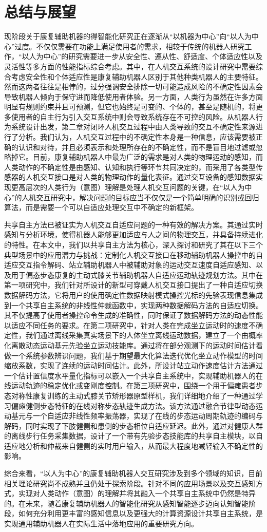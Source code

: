 \chapter{总结与展望}
现阶段关于康复辅助机器的得智能化研究正在逐渐从``以机器为中心''向``以人为中心''过度。不仅仅需要在功能上满足使用者的需求，相较于传统的机器人研究工作，``以人为中心''的研究需要进一步从安全性、遵从性、舒适度、个体适应性以及灵活性等多方面的性能指标综合考虑。其中，在人机交互系统的设计研究中需要综合考虑安全性和个体适应性是康复辅助机器人区别于其他种类机器人的主要特征。然而这两者往往是相悖的，过分强调安全排除一切可能造成风险的不确定性因素会导致机器人倾向于保守进而降低使用者体验。另一方面，人类行为虽然在许多方面明显有规则约束并且可预测，但它也始终是可变的、个体的，甚至是随机的，将更多使用者的自主行为引入交互系统中则会导致系统存在不可控的风险。从机器人行为系统设计出发，第二章对闭环人机交互过程中由人类导致的交互不确定性来源进行了分析。我们认为，人机交互过程中的不确定性本身是一种信息，应该需要被正确的认识和对待，并且必须表示和处理所存在的不确定性，而不是盲目地过滤或忽略掉它。目前，康复辅助机器人中最为广泛的需求是对人类的物理运动的感知，而人类动作的不确定性是由感知、认知和执行等环节共同决定的，而采用了各类型传感器的人机交互接口是对人类的物理动作的量化表征。通过交互设备的感知数据实现更高层次的人类行为（意图）理解是处理人机交互问题的关键，在``以人为中心''的人机交互研究中，解决问题的目标应当不仅仅是一个简单明确的识别或回归算法，而是需要一个可以自适应处理交互中不确定的新框架。

共享自主方法已被证实为人机交互自适应问题的一种有效的解决方案。其通过实时感知与分析环境，使得机器人能够更加适应与人之间的物理交互，并具备持续进化的特性。在本文中，我们以共享自主方法为核心，深入探讨和研究了其在以下三个典型场景中的应用潜力与挑战：定制化人机交互接口在移动辅助机器人操控中的自适应交互指令解码、站立辅助机器人中被辅助对象的运动交互速度自适应感知、以及用于偏态步态康复的主动式膝关节辅助机器人自适应运动轨迹规划方法。其中在第一项研究中，我们针对所设计的新型可穿戴人机交互接口提出了一种自适应切换数据解码方法，它将用户的使用确定性数据映射模式操控光标的先验表现信息集成到一个共享自主系统的非线性仲裁函数中，实现两种数据解码方法的自适应切换。其不仅提高了使用者操控命令生成的准确性，同时保证了数据解码方法的动态性能以适应不同任务的要求。在第二项研究中，针对人类在完成坐立运动时的速度不确定性，我们通过离线采集真实场景下的人体坐立离线运动数据，建立了一个由概率化离散动态运动基元先验坐立运动技能库。通过将在部分观测下的运动时间估计看做一个系统参数辨识问题，我们基于期望最大化算法迭代优化坐立动作模型的时间缩放系数，实现了连续的运动时间估计。此外，所设计站立动作速度估计方法通过一个估计置信度水平量化指标可以嵌入一个共享自主系统中，实现辅助机器人的在线运动轨迹的稳定优化或变刚度控制。在第三项研究中，围绕一个用于偏瘫患者步态对称性康复训练的主动式膝关节矫形器原型样机，我们详细地介绍了一种通过学习偏瘫健侧步态特征的在线对称步态轨迹生成方法。该方法通过融合节律型动态运动基元与一个自适应非线性频率振荡器，实现了在线的步态运动周期轨迹的编码与解码，同时实现了下肢健侧和患侧的步态相位自适应延迟。此外，通过对健康人群的离线步行任务采集数据，设计了一个带有先验步态技能库的共享自主模块，以自适应地分析和仲裁来自健侧的实时用户输入，从而最大程度地减轻输入不确定性的影响。

综合来看，``以人为中心''的康复辅助机器人交互研究涉及到多个领域的知识，目前相关理论研究尚不成熟并且仍处于探索阶段。针对不同的应用场景以及交互感知方式，实现对人类动作（意图）的理解并将其融入一个共享自主系统中仍然是特异的。在未来，随着康复辅助机器人的智能化研究从感知智能逐步迈向认知智能阶段，如何充分利用更丰富的感知信息以及更强大的计算资源设计共享自主系统，是实现通用辅助机器人在实际生活中落地应用的重要研究方向。